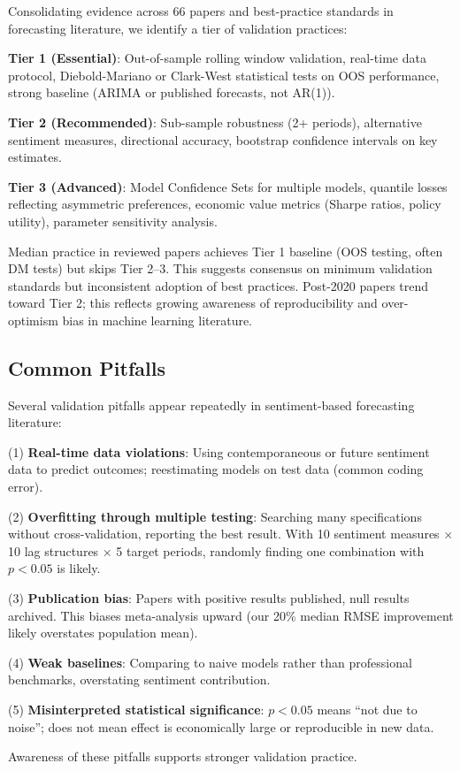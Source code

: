 Consolidating evidence across 66 papers and best-practice standards in forecasting literature, we identify a tier of validation practices:

\textbf{Tier 1 (Essential)}: Out-of-sample rolling window validation, real-time data protocol, Diebold-Mariano or Clark-West statistical tests on OOS performance, strong baseline (ARIMA or published forecasts, not AR(1)).

\textbf{Tier 2 (Recommended)}: Sub-sample robustness (2+ periods), alternative sentiment measures, directional accuracy, bootstrap confidence intervals on key estimates.

\textbf{Tier 3 (Advanced)}: Model Confidence Sets for multiple models, quantile losses reflecting asymmetric preferences, economic value metrics (Sharpe ratios, policy utility), parameter sensitivity analysis.

Median practice in reviewed papers achieves Tier 1 baseline (OOS testing, often DM tests) but skips Tier 2--3. This suggests consensus on minimum validation standards but inconsistent adoption of best practices. Post-2020 papers trend toward Tier 2; this reflects growing awareness of reproducibility and over-optimism bias in machine learning literature.

\subsection{Common Pitfalls}

Several validation pitfalls appear repeatedly in sentiment-based forecasting literature:

\noindent
(1) \textbf{Real-time data violations}: Using contemporaneous or future sentiment data to predict outcomes; reestimating models on test data (common coding error). 

\noindent
(2) \textbf{Overfitting through multiple testing}: Searching many specifications without cross-validation, reporting the best result. With 10 sentiment measures $\times$ 10 lag structures $\times$ 5 target periods, randomly finding one combination with $p < 0.05$ is likely.

\noindent
(3) \textbf{Publication bias}: Papers with positive results published, null results archived. This biases meta-analysis upward (our 20\% median RMSE improvement likely overstates population mean).

\noindent
(4) \textbf{Weak baselines}: Comparing to naive models rather than professional benchmarks, overstating sentiment contribution.

\noindent
(5) \textbf{Misinterpreted statistical significance}: $p < 0.05$ means ``not due to noise''; does not mean effect is economically large or reproducible in new data.

Awareness of these pitfalls supports stronger validation practice.

